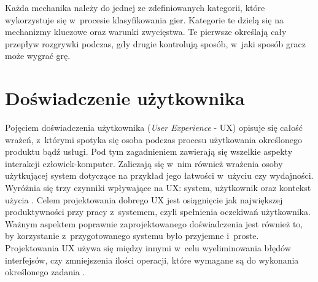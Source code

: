 \documentclass[a4paper,12pt,numbers=noenddot]{report}
\begin{document}
Każda mechanika należy do jednej ze zdefiniowanych kategorii, które wykorzystuje się w~procesie klasyfikowania gier. Kategorie te dzielą się na mechanizmy kluczowe oraz warunki zwycięstwa. Te pierwsze określają cały przepływ rozgrywki podczas, gdy drugie kontrolują sposób, w~jaki sposób gracz może wygrać grę.

\section{Doświadczenie użytkownika}

Pojęciem doświadczenia użytkownika (\textit{User Experience} - UX) opisuje się całość wrażeń, z~którymi spotyka się osoba podczas procesu użytkowania określonego produktu bądź usługi. Pod tym zagadnieniem zawierają się wszelkie aspekty interakcji człowiek-komputer. Zaliczają się w~nim również wrażenia osoby użytkującej system dotyczące na przykład jego łatwości w~użyciu czy wydajności. Wyróżnia się trzy czynniki wpływające na UX: system, użytkownik oraz kontekst użycia \cite{online_UXDef}.
Celem projektowania dobrego UX jest osiągnięcie jak największej produktywności przy pracy z~systemem, czyli spełnienia oczekiwań użytkownika. Ważnym aspektem poprawnie zaprojektowanego doświadczenia jest również to, by korzystanie z~przygotowanego systemu było przyjemne i~proste. Projektowania UX używa się między innymi w~celu wyeliminowania błędów interfejsów, czy zmniejszenia ilości operacji, które wymagane są do wykonania określonego zadania
\cite{art_UserExperience}.
\end{document}
